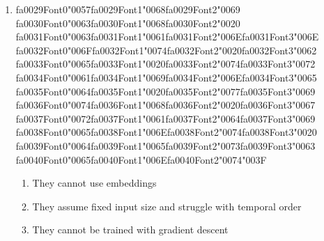 \documentclass[12pt]{article}
\begin{document}
\begin{enumerate}[label=Q\arabic*.]
\begin{enumerate}[label=(\Alph*)]
    \item To prevent the gradients from exploding
    \item To increase the speed of the training process
    \item To allow the model to handle variable-length sequences
\end{enumerate}
\item {\csname fa0029Font0\endcsname\char"0057}{\csname fa0029Font1\endcsname\char"0068}{\csname fa0029Font2\endcsname\char"0069} {\csname fa0030Font0\endcsname\char"0063}{\csname fa0030Font1\endcsname\char"0068}{\csname fa0030Font2\endcsname\char"0020} {\csname fa0031Font0\endcsname\char"0063}{\csname fa0031Font1\endcsname\char"0061}{\csname fa0031Font2\endcsname\char"006E}{\csname fa0031Font3\endcsname\char"006E} {\csname fa0032Font0\endcsname\char"006F}{\csname fa0032Font1\endcsname\char"0074}{\csname fa0032Font2\endcsname\char"0020}{\csname fa0032Font3\endcsname\char"0062} {\csname fa0033Font0\endcsname\char"0065}{\csname fa0033Font1\endcsname\char"0020}{\csname fa0033Font2\endcsname\char"0074}{\csname fa0033Font3\endcsname\char"0072} {\csname fa0034Font0\endcsname\char"0061}{\csname fa0034Font1\endcsname\char"0069}{\csname fa0034Font2\endcsname\char"006E}{\csname fa0034Font3\endcsname\char"0065} {\csname fa0035Font0\endcsname\char"0064}{\csname fa0035Font1\endcsname\char"0020}{\csname fa0035Font2\endcsname\char"0077}{\csname fa0035Font3\endcsname\char"0069} {\csname fa0036Font0\endcsname\char"0074}{\csname fa0036Font1\endcsname\char"0068}{\csname fa0036Font2\endcsname\char"0020}{\csname fa0036Font3\endcsname\char"0067} {\csname fa0037Font0\endcsname\char"0072}{\csname fa0037Font1\endcsname\char"0061}{\csname fa0037Font2\endcsname\char"0064}{\csname fa0037Font3\endcsname\char"0069} {\csname fa0038Font0\endcsname\char"0065}{\csname fa0038Font1\endcsname\char"006E}{\csname fa0038Font2\endcsname\char"0074}{\csname fa0038Font3\endcsname\char"0020} {\csname fa0039Font0\endcsname\char"0064}{\csname fa0039Font1\endcsname\char"0065}{\csname fa0039Font2\endcsname\char"0073}{\csname fa0039Font3\endcsname\char"0063} {\csname fa0040Font0\endcsname\char"0065}{\csname fa0040Font1\endcsname\char"006E}{\csname fa0040Font2\endcsname\char"0074}{\char"003F}
\begin{enumerate}[label=(\Alph*)]
    \item They cannot use embeddings
    \item They assume fixed input size and struggle with temporal order
    \item They cannot be trained with gradient descent

\end{enumerate}
\end{enumerate}
\end{document}
